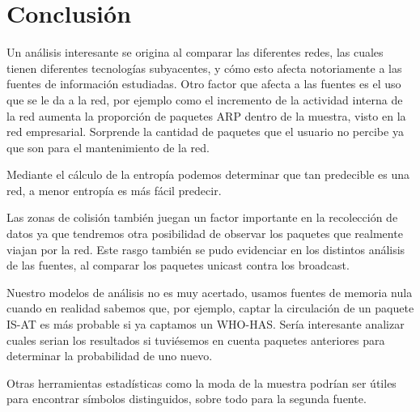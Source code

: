\section{Conclusión}

Un análisis interesante se origina al comparar las diferentes redes, las cuales tienen diferentes tecnologías subyacentes, y cómo esto afecta notoriamente a las fuentes de información estudiadas. Otro factor que afecta a las fuentes es el uso que se le da a la red, por ejemplo como el incremento de la actividad interna de la red aumenta la proporción de paquetes ARP dentro de la muestra, visto en la red empresarial. Sorprende la cantidad de paquetes que el usuario no percibe ya que son para el mantenimiento de la red.

Mediante el cálculo de la entropía podemos determinar que tan predecible es una red, a menor entropía es más fácil predecir.

Las zonas de colisión también juegan un factor importante en la recolección de datos ya que tendremos otra posibilidad de observar los paquetes que realmente viajan por la red. Este rasgo también se pudo evidenciar en los distintos análisis de las fuentes, al comparar los paquetes unicast contra los broadcast.

Nuestro modelos de análisis no es muy acertado, usamos fuentes de memoria nula cuando en realidad sabemos que, por ejemplo, captar la circulación de un paquete IS-AT es más probable si ya captamos un WHO-HAS. Sería interesante analizar cuales serian los resultados si tuviésemos en cuenta paquetes anteriores para determinar la probabilidad de uno nuevo.

Otras herramientas estadísticas como la moda de la muestra podrían ser útiles para encontrar símbolos distinguidos, sobre todo para la segunda fuente.

